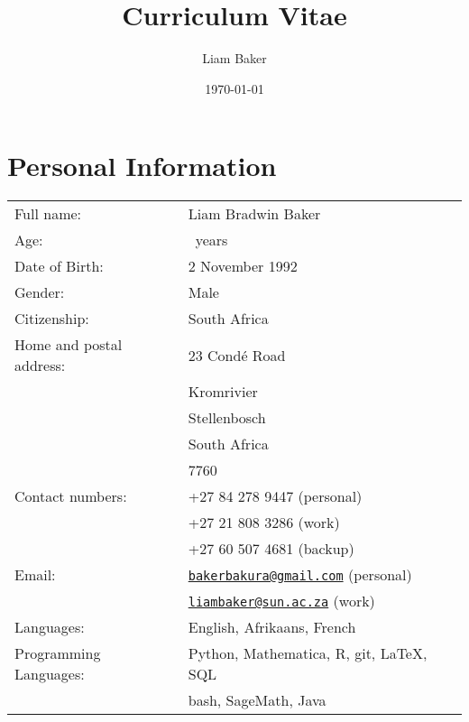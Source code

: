 \documentclass{article}
\author{Liam Baker}
\title{Curriculum Vitae}
\date{\today}
\newcommand{\email}[1]{\href{mailto:#1}{\texttt{#1}}}
\begin{document}
 \maketitle


\section{Personal Information}
\begin{center} \begin{tabular}{ll}
	Full name: 								& Liam Bradwin Baker \\
	Age: 											& \myyears~years \\
	Date of Birth:						& 2 November 1992 \\
	Gender: 									& Male \\
	Citizenship:							& South Africa \\
	Home and postal address:	& 23 Condé Road \\
														& Kromrivier \\
														& Stellenbosch \\
														& South Africa \\
														& 7760 \\
	Contact numbers:					& +27 84 278 9447 (personal) \\
														& +27 21 808 3286 (work) \\
														& +27 60 507 4681 (backup) \\
	Email:										& \email{bakerbakura@gmail.com} (personal)\\
														& \email{liambaker@sun.ac.za} (work) \\
	Languages:								& English, \footnotesize{Afrikaans}, \tiny{French} \\
	Programming Languages:		& Python, Mathematica, R, git, \LaTeX, SQL \\
														& \footnotesize{bash, SageMath, Java} \\
\end{tabular} \end{center}
\end{document}
